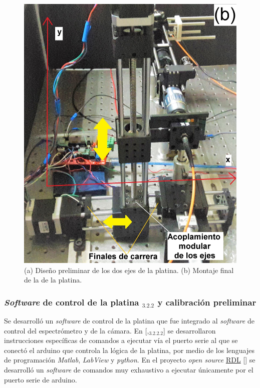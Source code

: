 \begin{figure}[H]
\includegraphics[scale=0.13]{Figs/microespectrometro/2ejesmontaje.jpeg}
\hfill%
\hfill%
\caption{(a) Diseño preliminar de los dos ejes de la platina. (b) Montaje final de la de la platina.}
\label{fig:2e}
\end{figure}


\singlespacing
\subsubsection{\textit{Software} de control de la platina \href{https://github.com/jrr1984/open\_frame\_XYStage}{\faGithub}$_{3.2.2}$  y calibración preliminar}
\label{sec:softcalib}

\hspace{0.5cm}Se desarrolló un \textit{software} de control de la platina que fue integrado al \textit{software} de control del espectrómetro y de la cámara. En [\cite{campbells},\href{https://github.com/raacampbell/openstage/tree/master/serialInterfaceScripts}{\faGithub$_{3.2.2.2}$}] se desarrollaron instrucciones específicas de comandos a ejecutar vía el puerto serie al que se conectó el arduino que controla la lógica de la platina, por medio de los lenguajes de programación \textit{Matlab}, \textit{LabView} y \textit{python}. En el proyecto \textit{open source} \href{https://www.youtube.com/watch?v=Lm8oprDhAnQ}{RDL} [\href{https://forum.arduino.cc/index.php?topic=469343}{\faCode}] se desarrolló un \textit{software} de comandos muy exhaustivo a ejecutar únicamente por el puerto serie de arduino.

